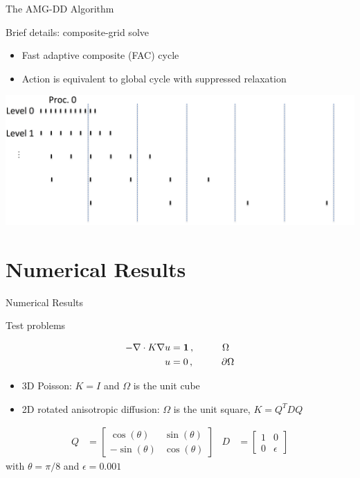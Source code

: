 \documentclass[18pt,xcolor=table]{beamer}
\begin{document}
\begin{frame}{The AMG-DD Algorithm}
\begin{block}{Brief details: composite-grid solve}
\begin{itemize}
\item Fast adaptive composite (FAC) cycle
\item Action is equivalent to global cycle with suppressed relaxation
\end{itemize}
\end{block}

\centering
\includegraphics[width=\textwidth]{figures/compGridCreation1D13}

\end{frame}



\section{Numerical Results}

\begin{frame}{Numerical Results}
\begin{block}{Test problems}

\begin{align*}
-\nabla \cdot K \nabla u &= \mathbf{1}\,, \hspace{1 cm} \Omega \\
u &= 0\,, \hspace{1 cm} \partial \Omega
\end{align*}

\begin{itemize}
\item 3D Poisson: $K = I$ and $\Omega$ is the unit cube
\item 2D rotated anisotropic diffusion: $\Omega$ is the unit square, $K = Q^TDQ$
\end{itemize}

\begin{align*}
Q &= \begin{bmatrix}
\cos(\theta) & \sin(\theta) \\
-\sin(\theta) & \cos(\theta)
\end{bmatrix}
&
D &= \begin{bmatrix}
1 & 0\\
0 & \epsilon
\end{bmatrix}
\end{align*}
with $\theta=\pi/8$ and $\epsilon=0.001$
\end{block}


\end{frame}
\end{document}
